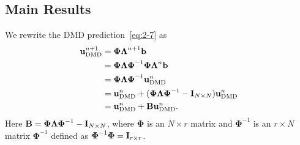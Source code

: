 \documentclass[10pt]{article}
\numberwithin{equation}{section}
\theoremstyle{plain}
\theoremstyle{remark}
\theoremstyle{remark}
\begin{document}
\subsection{Main Results}
We rewrite the DMD prediction~\cref{eq:2-7} as
\begin{equation}\label{eq:3-7}
\begin{aligned}
\bold u_\text{DMD}^{n+1}& = \boldsymbol\Phi\boldsymbol\Lambda^{n+1}\bold b \\
&=\boldsymbol\Phi\boldsymbol\Lambda\boldsymbol\Phi^{-1}\boldsymbol\Phi\boldsymbol\Lambda^{n}\bold b \\
&= \boldsymbol\Phi\boldsymbol\Lambda\boldsymbol\Phi^{-1}\bold u_\text{DMD}^n\\
&=\bold u_\text{DMD}^n +(\boldsymbol\Phi\boldsymbol\Lambda\boldsymbol\Phi^{-1}-\bold I_{N\times N})\bold u_\text{DMD}^n \\
&=\bold u_\text{DMD}^n +\bold B\bold u_\text{DMD}^n.
\end{aligned}
\end{equation}
Here $\bold B =\boldsymbol\Phi\boldsymbol\Lambda\boldsymbol\Phi^{-1}-\bold I_{N\times N}$, where $\boldsymbol\Phi$ is an $N\times r$ matrix and $\boldsymbol\Phi^{-1}$ is an $r\times N$ matrix $\boldsymbol\Phi^{-1}$ defined as $\boldsymbol\Phi^{-1}\boldsymbol\Phi =\bold I_{r\times r}$.
\end{document}
